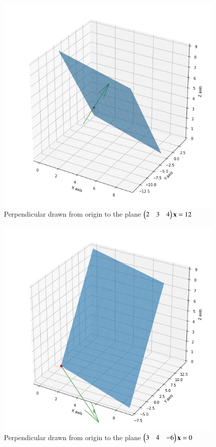 \documentclass[journal,12pt,twocolumn]{IEEEtran}
\begin{document}
\begin{figure}[h!]
    \centering
    \includegraphics[width=\columnwidth]{plane1.png}
    \caption{Perpendicular drawn from origin to the plane $\begin{pmatrix}2&3&4\end{pmatrix}\mathbf{x} = 12$}
    \label{myfig1}
\end{figure}
\renewcommand{\thefigure}{b}
\begin{figure}[h!]
    \centering
    \includegraphics[width=\columnwidth]{plane2.png}
    \caption{Perpendicular drawn from origin to the plane $\begin{pmatrix}3&4&-6\end{pmatrix}\mathbf{x} = 0$}
    \label{myfig2}
\end{figure}
\end{document}
